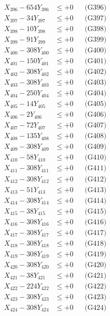 \documentclass[a4paper,10pt]{article}
\begin{document}
{\begin{align}
X_{396} - 654Y_{396} &\leq +0 && \text{(G396)} \\
X_{397} - 34Y_{397} &\leq +0 && \text{(G397)} \\
X_{398} - 10Y_{398} &\leq +0 && \text{(G398)} \\
X_{399} - 91Y_{399} &\leq +0 && \text{(G399)} \\
X_{400} - 308Y_{400} &\leq +0 && \text{(G400)} \\
\allowbreak
X_{401} - 150Y_{401} &\leq +0 && \text{(G401)} \\
X_{402} - 308Y_{402} &\leq +0 && \text{(G402)} \\
X_{403} - 308Y_{403} &\leq +0 && \text{(G403)} \\
X_{404} - 250Y_{404} &\leq +0 && \text{(G404)} \\
X_{405} - 14Y_{405} &\leq +0 && \text{(G405)} \\
X_{406} - 2Y_{406} &\leq +0 && \text{(G406)} \\
X_{407} - 72Y_{407} &\leq +0 && \text{(G407)} \\
X_{408} - 135Y_{408} &\leq +0 && \text{(G408)} \\
X_{409} - 308Y_{409} &\leq +0 && \text{(G409)} \\
X_{410} - 58Y_{410} &\leq +0 && \text{(G410)} \\
\allowbreak
X_{411} - 308Y_{411} &\leq +0 && \text{(G411)} \\
X_{412} - 308Y_{412} &\leq +0 && \text{(G412)} \\
X_{413} - 51Y_{413} &\leq +0 && \text{(G413)} \\
X_{414} - 308Y_{414} &\leq +0 && \text{(G414)} \\
X_{415} - 38Y_{415} &\leq +0 && \text{(G415)} \\
X_{416} - 308Y_{416} &\leq +0 && \text{(G416)} \\
X_{417} - 308Y_{417} &\leq +0 && \text{(G417)} \\
X_{418} - 308Y_{418} &\leq +0 && \text{(G418)} \\
X_{419} - 308Y_{419} &\leq +0 && \text{(G419)} \\
X_{420} - 308Y_{420} &\leq +0 && \text{(G420)} \\
\allowbreak
X_{421} - 38Y_{421} &\leq +0 && \text{(G421)} \\
X_{422} - 224Y_{422} &\leq +0 && \text{(G422)} \\
X_{423} - 308Y_{423} &\leq +0 && \text{(G423)} \\
X_{424} - 308Y_{424} &\leq +0 && \text{(G424)} \\

\end{align}}
\end{document}
